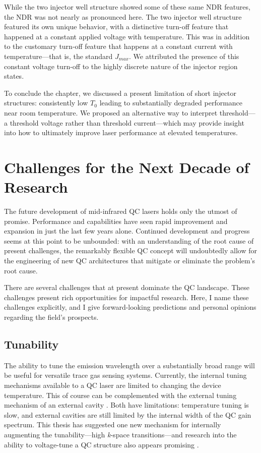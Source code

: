 While the two injector well structure showed some of these same NDR features, the NDR was not nearly as pronounced here.  The two injector well structure featured its own unique behavior, with a distinctive turn-off feature that happened at a constant applied voltage with temperature.  This was in addition to the customary turn-off feature that happens at a constant current with temperature---that is, the standard $J_{max}$.  We attributed the presence of this constant voltage turn-off to the highly discrete nature of the injector region states.

To conclude the chapter, we discussed a present limitation of short injector structures: consistently low $T_0$ leading to substantially degraded performance near room temperature.  We proposed an alternative way to interpret threshold---a threshold voltage rather than threshold current---which may provide insight into how to ultimately improve laser performance at elevated temperatures.


\section{Challenges for the Next Decade of Research}

The future development of mid-infrared QC lasers holds only the utmost of promise.  Performance and capabilities have seen rapid improvement and expansion in just the last few years alone.  Continued development and progress seems at this point to be unbounded: with an understanding of the root cause of present challenges, the remarkably flexible QC concept will undoubtedly allow for the engineering of new QC architectures that mitigate or eliminate the problem's root cause.

There are several challenges that at present dominate the QC landscape.  These challenges present rich opportunities for impactful research.  Here, I name these challenges explicitly, and I give forward-looking predictions and personal opinions regarding the field's prospects.

\subsection{Tunability}

The ability to tune the emission wavelength over a substantially broad range will be useful for versatile trace gas sensing systems.  Currently, the internal tuning mechanisms available to a QC laser are limited to changing the device temperature.  This of course can be complemented with the external tuning mechanism of an external cavity \cite{Wysocki:APB:2008}.  Both have limitations: temperature tuning is slow, and external cavities are still limited by the internal width of the QC gain spectrum.  This thesis has suggested one new mechanism for internally augmenting the tunability---high \emph{k}-space transitions---and research into the ability to voltage-tune a QC structure also appears promising \cite{Yao:JQE:2009}.

